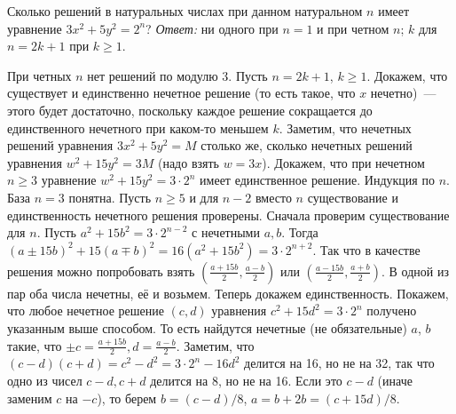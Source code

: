 \problem{}
Сколько решений в натуральных числах при данном натуральном $n$ имеет уравнение
$3 x^2 + 5 y^2 = 2^n$?
\solution
\emph{Ответ:}
ни одного при $n = 1$ и при четном $n$;
$k$ для $n = 2 k + 1$ при $k \geq 1$.
\par
При четных $n$ нет решений по модулю 3.
Пусть $n = 2 k + 1$, $k \geq 1$.
Докажем, что существует и единственно нечетное решение
(то есть такое, что $x$ нечетно)~--- этого будет достаточно, поскольку каждое
решение сокращается до единственного нечетного при каком-то меньшем $k$.
Заметим, что нечетных решений уравнения $3 x^2 + 5 y^2 = M$ столько же, сколько
нечетных решений уравнения $w^2 + 15 y^2 = 3 M$ (надо взять $w = 3 x$).
Докажем, что при нечетном $n \geq 3$ уравнение $w^2 + 15 y^2 = 3 \cdot 2^n$
имеет единственное решение.
Индукция по $n$.
База $n = 3$ понятна.
Пусть $n \geq 5$ и для $n - 2$ вместо $n$ существование и единственность
нечетного решения проверены.
Сначала проверим существование для $n$.
Пусть $a^2 + 15 b^2 = 3 \cdot 2^{n - 2}$ с нечетными $a, b$.
Тогда
\(
    (a \pm 15 b)^2 + 15(a \mp b)^2
=
    16(a^2 + 15 b^2)
=
    3 \cdot 2^{n + 2}
\).
Так что в качестве решения можно попробовать взять
$(\frac{a + 15 b}{2}, \frac{a - b}{2})$
или
$(\frac{a - 15 b}{2}, \frac{a + b}{2})$.
В одной из пар оба числа нечетны, её и возьмем.
Теперь докажем единственность.
Покажем, что любое нечетное решение $(c, d)$ уравнения
$c^2 + 15 d^2 = 3 \cdot 2^n$ получено указанным выше способом.
То есть найдутся нечетные (не обязательные) $a$, $b$ такие, что
$\pm c = \frac{a + 15 b}{2}, d = \frac{a - b}{2}$.
Заметим, что $(c - d)(c + d) = c^2 - d^2 = 3 \cdot 2^n - 16 d^2$ делится на 16,
но не на 32, так что одно из чисел $c - d, c + d$ делится на 8, но не на 16.
Если это $c - d$ (иначе заменим $c$ на $-c$), то берем $b = (c - d) / 8$,
$a = b + 2 b = (c + 15 d) / 8$.
\endproblem
